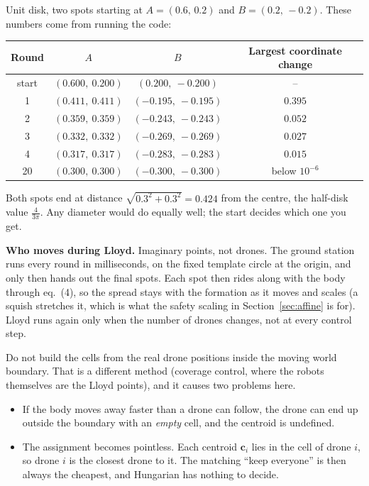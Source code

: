 \documentclass[11pt,a4paper]{article}
\newcommand{\vect}[1]{\mathbf{#1}}
\begin{document}
\begin{examplebox}
Unit disk, two spots starting at $A=(0.6,\,0.2)$ and $B=(0.2,\,-0.2)$. These numbers come from running the code:
\begin{center}\small
\begin{tabular}{@{}cccc@{}}
\toprule
Round & $A$ & $B$ & Largest coordinate change\\
\midrule
start & $(0.600,\ 0.200)$ & $(0.200,\ -0.200)$ & --\\
1 & $(0.411,\ 0.411)$ & $(-0.195,\ -0.195)$ & $0.395$\\
2 & $(0.359,\ 0.359)$ & $(-0.243,\ -0.243)$ & $0.052$\\
3 & $(0.332,\ 0.332)$ & $(-0.269,\ -0.269)$ & $0.027$\\
4 & $(0.317,\ 0.317)$ & $(-0.283,\ -0.283)$ & $0.015$\\
20 & $(0.300,\ 0.300)$ & $(-0.300,\ -0.300)$ & below $10^{-6}$\\
\bottomrule
\end{tabular}
\end{center}
Both spots end at distance $\sqrt{0.3^2+0.3^2}=0.424$ from the centre, the half-disk value $\tfrac{4}{3\pi}$. Any
diameter would do equally well; the start decides which one you get.
\end{examplebox}

\textbf{Who moves during Lloyd.} Imaginary points, not drones. The ground station runs every round in milliseconds,
on the fixed template circle at the origin, and only then hands out the final spots. Each spot then rides along with
the body through eq.~(4), so the spread stays with the formation as it moves and scales (a squish stretches it, which
is what the safety scaling in Section~\ref{sec:affine} is for). Lloyd runs again only when the number of drones
changes, not at every control step.

\begin{watchbox}
Do not build the cells from the real drone positions inside the moving world boundary. That is a different method
(coverage control, where the robots themselves are the Lloyd points), and it causes two problems here.
\begin{itemize}[leftmargin=*]
\item If the body moves away faster than a drone can follow, the drone can end up outside the boundary with an
\emph{empty} cell, and the centroid is undefined.
\item The assignment becomes pointless. Each centroid $\vect{c}_i$ lies in the cell of drone $i$, so drone $i$ is the
closest drone to it. The matching ``keep everyone'' is then always the cheapest, and Hungarian has nothing to decide.
\end{itemize}
\end{watchbox}
\end{document}
